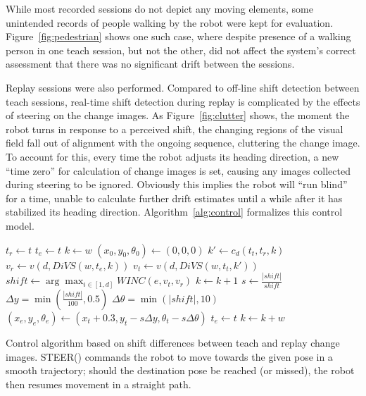 \documentclass[twocolumn, 9pt,fleqn]{jsproceedings}
\begin{document}
While most recorded sessions do not depict any moving elements, some unintended records of people walking by the robot were kept for evaluation. Figure~\ref{fig:pedestrian} shows one such case, where despite presence of a walking person in one teach session, but not the other, did not affect the system's correct assessment that there was no significant drift between the sessions.

Replay sessions were also performed. Compared to off-line shift detection between teach sessions, real-time shift detection during replay is complicated by the effects of steering on the change images. As Figure~\ref{fig:clutter} shows, the moment the robot turns in response to a perceived shift, the changing regions of the visual field fall out of alignment with the ongoing sequence, cluttering the change image. To account for this, every time the robot adjusts its heading direction, a new ``time zero'' for calculation of change images is set, causing any images collected during steering to be ignored. Obviously this implies the robot will ``run blind'' for a time, unable to calculate further drift estimates until a while after it has stabilized its heading direction. Algorithm~\ref{alg:control} formalizes this control model.

\begin{algorithm}
\begin{algorithmic}
\State $t_r \gets t$ 
\State $t_e \gets t$
\State $k \gets w$
\State $(x_0, y_0, \theta_0) \gets (0, 0, 0)$ 
\State {} 
\Repeat
    \State {} 
    \State $k' \gets c_d(t_t, t_r, k)$
    \State $v_r \gets v(d, DiVS(w, t_e, k))$
    \State $v_t \gets v(d, DiVS(w, t_t, k'))$
    \State $shift \gets \arg \max_{i \in [1, d]}{WINC(e, v_t, v_r)}$
        \State $k \gets k + 1$
    \Else
        \State $s \gets \frac{|shift|}{shift}$ 
        \State $\Delta y = \min{(\frac{|shift|}{100}, 0.5)}$
        \State $\Delta \theta = \min{(|shift|, 10)}$
        \State $(x_e, y_e, \theta_e) \gets (x_t + 0.3, y_t - s \Delta y, \theta_t - s \Delta \theta)$
        \State {} 
        \State {}
        \State $t_e \gets t$
        \State $k \gets k + w$
    \EndIf
{}
\end{algorithmic}
\caption{Control algorithm based on shift differences between teach and replay change images. STEER() commands the robot to move towards the given pose in a smooth trajectory; should the destination pose be reached (or missed), the robot then resumes movement in a straight path.}
\label{alg:control}
\end{algorithm}
\end{document}
